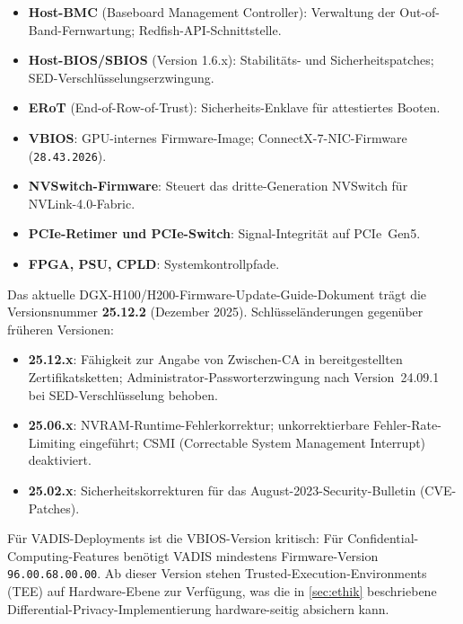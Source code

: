 ﻿\documentclass[12pt,a4paper]{article}
\begin{document}
\begin{itemize}[leftmargin=1.4em, itemsep=1pt]
  \item \textbf{Host-BMC} (Baseboard Management Controller):
        Verwaltung der Out-of-Band-Fern\-wartung; Redfish-API-Schnittstelle.
  \item \textbf{Host-BIOS/SBIOS} (Version 1.6.x): Stabilitäts-
        und Sicherheitspatches; SED-Ver\-schlüsselungs\-erzwingung.
  \item \textbf{ERoT} (End-of-Row-of-Trust): Sicherheits-Enklave
        für attestiertes Booten.
  \item \textbf{VBIOS}: GPU-internes Firmware-Image;
        ConnectX-7-NIC-Firmware (\texttt{28.43.2026}).
  \item \textbf{NVSwitch-Firmware}: Steuert das dritte-Generation
        NVSwitch für NVLink-4.0-Fabric.
  \item \textbf{PCIe-Retimer und PCIe-Switch}: Signal-Integrität
        auf PCIe~Gen5.
  \item \textbf{FPGA, PSU, CPLD}: Systemkontrollpfade.
\end{itemize}

\noindent Das aktuelle DGX-H100/H200-Firmware-Update-Guide-Dokument
trägt die Versionsnummer \textbf{25.12.2} (Dezember 2025).
Schlüsseländerungen gegenüber früheren Versionen:

\begin{itemize}[leftmargin=1.4em, itemsep=1pt]
  \item \textbf{25.12.x}: Fähigkeit zur Angabe von Zwischen-CA in
        bereitgestellten Zertifikatsketten; Administrator-Passworterzwingung
        nach Version~24.09.1 bei SED-Verschlüsselung behoben.
  \item \textbf{25.06.x}: NVRAM-Runtime-Fehlerkorrektur;
        unkorrektierbare Fehler-Rate-Limiting eingeführt;
        CSMI (Correctable System Management Interrupt) deaktiviert.
  \item \textbf{25.02.x}: Sicherheitskorrekturen für das
        August-2023-Security-Bulletin (CVE-Patches).
\end{itemize}

\noindent Für VADIS-Deployments ist die VBIOS-Version kritisch:
Für Confidential-Computing-Features benötigt VADIS mindestens
Firmware-Version \texttt{96.00.68.00.00}. Ab dieser Version
stehen Trusted-Execution-Environments (TEE) auf Hardware-Ebene
zur Verfügung, was die in \cref{sec:ethik} beschriebene
Differential-Privacy-Implementierung hardware-seitig absichern kann.
\end{document}
